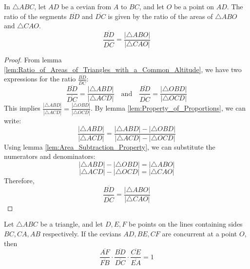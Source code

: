 \begin{lemma}
    \label{lem:Segment_Ratio_as_a_Ratio_of_Triangle_Areas}
    In $\triangle ABC$, let $AD$ be a cevian from $A$ to $BC$, and let $O$ be a point on $AD$. The ratio of the segments $\overline{BD}$ and $\overline{DC}$ is given by the ratio of the areas of $\triangle ABO$ and $\triangle CAO$.
    \[ \frac{\overline{BD}}{\overline{DC}} = \frac{|\triangle ABO|}{|\triangle CAO|} \]
\end{lemma}

\begin{proof}
    From lemma \ref{lem:Ratio_of_Areas_of_Triangles_with_a_Common_Altitude}, we have two expressions for the ratio $\frac{\overline{BD}}{\overline{DC}}$:
    \[ \frac{\overline{BD}}{\overline{DC}} = \frac{|\triangle ABD|}{|\triangle ACD|} \quad \text{and} \quad \frac{\overline{BD}}{\overline{DC}} = \frac{|\triangle OBD|}{|\triangle OCD|} \]
    This implies $\frac{|\triangle ABD|}{|\triangle ACD|} = \frac{|\triangle OBD|}{|\triangle OCD|}$.
    By lemma \ref{lem:Property_of_Proportions}, we can write:
    \[ \frac{|\triangle ABD|}{|\triangle ACD|} = \frac{|\triangle ABD| - |\triangle OBD|}{|\triangle ACD| - |\triangle OCD|} \]
    Using lemma \ref{lem:Area_Subtraction_Property}, we can substitute the numerators and denominators:
    \[ |\triangle ABD| - |\triangle OBD| = |\triangle ABO| \]
    \[ |\triangle ACD| - |\triangle OCD| = |\triangle CAO| \]
    Therefore,
    \[ \frac{\overline{BD}}{\overline{DC}} = \frac{|\triangle ABO|}{|\triangle CAO|} \]
\end{proof}

\begin{theorem}
    \label{thm:Cevas_Theorem_Direct}
    Let $\triangle ABC$ be a triangle, and let $D, E, F$ be points on the lines containing sides $BC, CA, AB$ respectively. If the cevians $AD, BE, CF$ are concurrent at a point $O$, then
    \[ \frac{\overline{AF}}{\overline{FB}} \cdot \frac{\overline{BD}}{\overline{DC}} \cdot \frac{\overline{CE}}{\overline{EA}} = 1 \]
\end{theorem}

